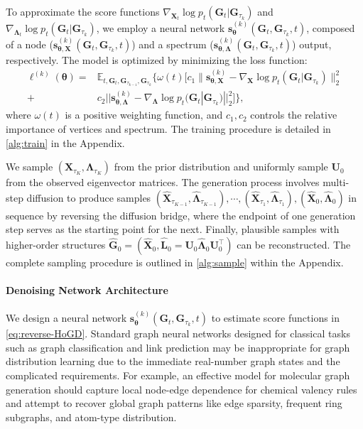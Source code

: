 To approximate the score functions $\nabla_{\bm{X}_t} \log p_t(\bm{G}_t | \bm{G}_{\tau_k})$ and $\nabla_{\bm{\Lambda}_t} \log p_t(\bm{G}_t | \bm{G}_{\tau_k})$, we employ a neural network $\bm{s}^{(k)}_{\bm{\theta}}(\bm{G}_t, \bm{G}_{\tau_k},t)$, composed of a node ($\bm{s}^{(k)}_{\bm{\theta},\bm{X}}(\bm{G}_t, \bm{G}_{\tau_k},t)$) and a spectrum ($\bm{s}^{(k)}_{\bm{\theta},\bm{\Lambda}}(\bm{G}_t, \bm{G}_{\tau_k},t)$) output, respectively.
The model is optimized by minimizing the loss function:
\fontsize{8pt}{8pt}\selectfont
\begin{align}
\ell^{(k)}(\bm{\theta})=&
\mathbb{E}_{t,\bm{G}_t,\bm{G}_{\tau_{k-1}},\bm{G}_{\tau_k}} \{\omega(t) [c_1\|
\bm{s}^{(k)}_{\bm{\theta},\bm{X}} - \nabla_{\bm{X}} \log p_t(\bm{G}_t | \bm{G}_{\tau_k})\|_2^2 \nonumber \\  
+&c_2 ||\bm{s}^{(k)}_{\bm{\theta},\bm{\Lambda}} - \nabla_{\bm{\Lambda}} \log p_t(\bm{G}_t | \bm{G}_{\tau_k})||_2^2]\}, \label{eq:final-loss}  
\end{align}
\normalsize 
where $\omega(t)$ is a positive weighting function, and $c_1, c_2$ controls the relative importance of vertices and spectrum.
The training procedure is detailed in \cref{alg:train} in the Appendix.




We sample $(\bm{X}_{\tau_K},\bm{\Lambda}_{\tau_K})$ from the prior distribution and uniformly sample $\bm{U}_0$ from the observed eigenvector matrices.
The generation process involves multi-step diffusion to produce samples $(\hat{\bm{X}}_{\tau_{K-1}}, \hat{\bm{\Lambda}}_{\tau_{K-1}}), \cdots, (\hat{\bm{X}}_{\tau_1}, \hat{\bm{\Lambda}}_{\tau_1}), (\hat{\bm{X}}_0, \hat{\bm{\Lambda}}_0)$ in sequence by reversing the diffusion bridge, where the endpoint of one generation step serves as the starting point for the next. 
Finally, plausible samples with higher-order structures $\hat{\bm{G}}_0=(\hat{\bm{X}}_0 , \hat{\bm{L}}_0 =\bm{U}_0 \hat{\bm{\Lambda}}_0 \bm{U}_0^\top)$ can be reconstructed.
The complete sampling procedure is outlined in \cref{alg:sample} within the Appendix.



\paragraph{Denoising Network Architecture}
We design a neural network $\bm{s}^{(k)}_{\bm{\theta}}(\bm{G}_t, \bm{G}_{\tau_k},t) $ to estimate score functions in \cref{eq:reverse-HoGD}.
Standard graph neural networks designed for classical tasks such as graph classification and link prediction may be inappropriate for graph distribution learning due to the immediate real-number graph states and the complicated requirements. 
For example, an effective model for molecular graph generation should capture local node-edge dependence for chemical valency rules and attempt to recover global graph patterns like edge sparsity, frequent ring subgraphs, and atom-type distribution.




